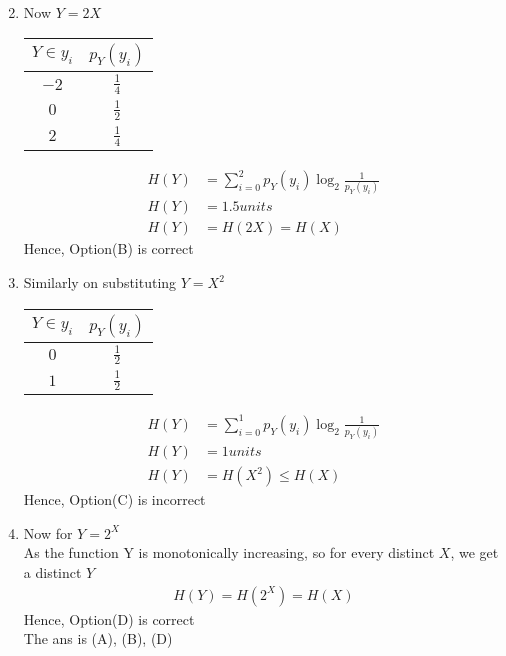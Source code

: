 \documentclass[journal,12pt,onecolumn]{IEEEtran}
\theoremstyle{remark}
\begin{document}
\begin{enumerate}
\begin{align}
 \end{align}
\item Now $ Y = 2X$
 \begin{table}[htpb]
\centering 
\begin{tabular}{|c|c|}
\hline
$Y \in y_i$	&          $p_Y(y_i)$\\
\hline
$-2$                         & $\frac{1}{4} $       \\
\hline
$0$                         & $\frac{1}{2} $ \\
\hline
$2$                         & $\frac{1}{4}$ \\
\hline
\end{tabular}
\end{table}
\begin{align}
H(Y) &= \sum_{i=0}^{2}p_Y(y_i) \log _{2} \frac{1}{p_Y(y_i)}\\
H(Y) &=  1.5 units\\
  H(Y) &= H(2X) =H(X)
 \end{align}
 Hence, Option(B) is correct\\
 \item Similarly on substituting $Y = X^2$\\
  \begin{table}[htpb]
\centering 
\begin{tabular}{|c|c|}
\hline
$Y \in y_i$	&	$p_Y(y_i)$\\
\hline
$0$                         & $\frac{1}{2} $       \\
\hline
$1$                         & $\frac{1}{2} $ \\
\hline
\end{tabular}
\end{table}
 \begin{align}
H(Y) &= \sum_{i=0}^{1}p_Y(y_i) \log _{2} \frac{1}{p_Y(y_i)}\\
H(Y) &=  1units\\
  H(Y) &= H(X^2) \leq H(X)
 \end{align}
 Hence, Option(C) is incorrect\\
 \item Now for $Y = 2^X$\\
 As the function Y is monotonically increasing, so for every distinct $X$, we get a distinct $Y$ 
 \begin{align}
  H(Y) = H(2^X) =  H(X) 
 \end{align}
 Hence, Option(D) is correct\\
 The ans is (A), (B), (D)
 \end{enumerate}
\end{document}
